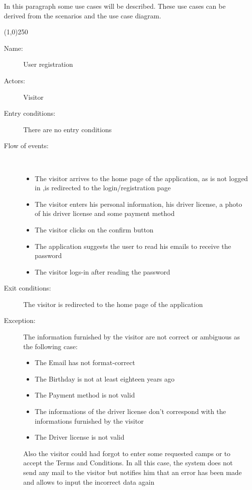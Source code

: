 In this paragraph some use cases will be described. These use cases can be derived from the scenarios and the use case diagram.


\begin{center}
\line(1,0){250}
\end{center}

\begin{description}
	\item[Name:] User registration
	\item[Actors:] Visitor
	\item[Entry conditions:] There are no entry conditions
	\item[Flow of events:]  \ \\
		\begin{itemize}
			\item The visitor arrives to the home page of the application, as is not logged in ,is redirected to the login/registration page
			\item The visitor enters his personal information, his driver license, a photo of his driver license and some payment method
			\item The visitor clicks on the confirm button
			\item The application suggests the user to read his emails to receive the password
			\item The visitor logs-in after reading the password
		\end{itemize}
	\item[Exit conditions:] The visitor is redirected to the home page of the application
	\item [Exception:] The information furnished by the visitor are not correct or ambiguous as the following case:
		\begin{itemize}
			\item The Email has not format-correct
			\item The Birthday is not at least eighteen years ago
			\item The Payment method is not valid
			\item The informations of the driver license don't correspond with the informations furnished by the visitor
			\item The Driver license is not valid
		\end {itemize}
		Also the visitor could had forgot to enter some requested camps or to accept the Terms and Conditions. In all this case, the system does not send any mail to the visitor but notifies him that an error has been made and allows to input the incorrect data again
	\end{description}

